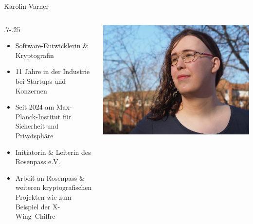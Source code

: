 \begin{frame}{Karolin Varner}
  \begin{columns}[fullwidth,c]
	\hspace*{.25\LeftSlideIndent}%
    \begin{column}{\dimexpr.7\linewidth-.25\LeftSlideIndent}
      \begin{itemize}
        \item Software-Entwicklerin \& Kryptografin
        \item 11 Jahre in der Industrie bei Startups und Konzernen
        \item Seit 2024 am Max-Planck-Institut für Sicherheit und Privatsphäre
        \item Initiatorin \& Leiterin des Rosenpass e.V.
        \item Arbeit an Rosenpass \& weiteren kryptografischen Projekten wie zum Beispiel der X-Wing~Chiffre
      \end{itemize}
    \end{column}%
    \begin{column}{.3\linewidth}
      \includegraphics[width=.92\linewidth,trim=200 0 100 0,clip]{graphics/karolin-varner.jpg}
    \end{column}
  \end{columns}
\end{frame}

